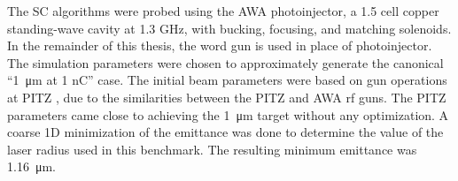 The SC algorithms were probed using the AWA photoinjector, 
a 1.5 cell copper standing-wave cavity at 1.3 GHz, 
with bucking, focusing, and matching solenoids. 
In the remainder of this thesis, the word gun is used 
in place of photoinjector. The simulation parameters were chosen to 
approximately generate the canonical “\SI{1}{\micro\metre} at 1 nC” case.   
The initial beam parameters were based on gun operations at PITZ \cite{pitz},
due to the similarities between the PITZ and AWA rf guns.
The PITZ parameters came close to achieving the \SI{1}{\micro\metre}
target without any optimization. A coarse 1D minimization
 of the 
emittance was done to determine the value of the laser radius 
used in this benchmark. The resulting minimum emittance was   
\SI{1.16}{\micro\metre}. 

